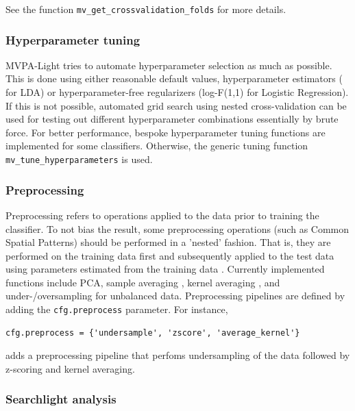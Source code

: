 \documentclass[utf8]{frontiersSCNS} %
\newcommand{\ttt}[1]{\texttt{#1}}
\begin{document}
See the function \ttt{mv\_get\_crossvalidation\_folds} for more details.

\subsubsection{Hyperparameter tuning}

MVPA-Light tries to automate hyperparameter selection as much as possible. This is done using either reasonable default values, hyperparameter estimators (\cite{Ledoit2003HoneyMatrix} for LDA) or  hyperparameter-free regularizers (log-F(1,1) for Logistic Regression). If this is not possible, automated grid search using nested cross-validation can be used for testing out different hyperparameter combinations essentially by brute force. For better performance, bespoke hyperparameter tuning functions are implemented for some classifiers. Otherwise, the generic tuning function \ttt{mv\_tune\_hyperparameters} is used.

\subsubsection{Preprocessing}\label{sec:preprocessing}

Preprocessing refers to operations applied to the data prior to training the classifier. To not bias the result, some preprocessing operations (such as Common Spatial Patterns) should be performed in a 'nested' fashion. That is, they are performed on the training data first and subsequently applied to the test data using parameters estimated from the training data \citep{Lemm2011,Varoquaux2017}.
Currently implemented functions include PCA, sample averaging \citep{Cichy2017MultivariateSpace}, kernel averaging \citep{Treder2018}, and under-/oversampling for unbalanced data. Preprocessing pipelines are defined by adding the \ttt{cfg.preprocess} parameter. For instance,

\begin{verbatim}
cfg.preprocess = {'undersample', 'zscore', 'average_kernel'}
\end{verbatim}

adds a preprocessing pipeline that perfoms undersampling of the data followed by z-scoring and kernel averaging.

\subsubsection{Searchlight analysis}\label{sec:searchlight}
\end{document}
